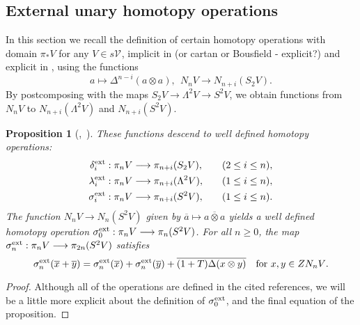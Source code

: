 \documentclass[11pt]{amsart}
\theoremstyle{plain}
\newtheorem{prop}[thm]{Proposition}
\theoremstyle{definition}
\let\oldphi\phi
\let\phi\varphi
\renewcommand{\to}{\longrightarrow}
\newcommand{\calV}{\mathcal{V}}
\theoremstyle{plain}
\newcommand{\vect}[2]{\calV^{#1}_{#2}}
\newcommand{\DeltaUp}{\Delta}%
\begin{document}
\begin{Constructing homotopy and cohomotopy operations}
\subsection{External unary homotopy operations}
In this section we recall the definition of certain homotopy operations with domain $\pi_*V$ for any $V\in s\vect{}{}$, implicit in \cite[\S4]{DwyerHtpyOpsSimpComAlg.pdf} (or cartan or Bousfield - explicit?) and explicit in 
\cite[\S3]{MR1089001}, using the functions
\[a \mapsto \DeltaUp^{n-i}(a\otimes a),\ \ N_nV \to N_{n+i}(S_2V).\]
By postcomposing with the maps $S_2V\to \Lambda^{2}V\to S^2V$, we obtain functions from $N_nV$ to $N_{n+i}(\Lambda^2V)$ and $N_{n+i}(S^2V)$.
\begin{prop}[{\cite[Lemma 4.1]{DwyerHtpyOpsSimpComAlg.pdf},\ \cite[\S3]{MR1089001}}] \label{extUnaryHomotOps}
These functions descend to  well defined homotopy operations:
\begin{alignat*}{2}
\delta_i^\textup{ext}:\pi_nV&\to \pi_{n+i}(S_2V),&\quad&(2\leq i\leq n),\\
\lambda_i^\textup{ext}:\pi_nV&\to \pi_{n+i}(\Lambda^2V),&\quad&(1\leq i\leq n),\\
\sigma_i^\textup{ext}:\pi_nV&\to \pi_{n+i}(S^2V),&\quad&(1\leq i\leq n).
\end{alignat*}
The function $N_nV \to N_{n}(S^2V)$ given by $\overline{a}\mapsto \overline{a\otimes a}$ yields a well defined homotopy operation $\sigma_0^\textup{ext}:\pi_nV\to \pi_{n}(S^2V)$. 
For all $n\geq0$, the map $\sigma_n^\textup{ext}:\pi_nV\to\pi_{2n}(S^2V)$ satisfies
\[\sigma_n^\textup{ext}(\overline{x}+\overline{y})=\sigma_n^\textup{ext}(\overline{x})+\sigma_n^\textup{ext}(\overline{y})+\overline{(1+T)\Delta(x\otimes y)}\quad\text{for $x,y\in ZN_nV$}.\]
\end{prop}
\begin{proof}
Although all of the operations  are defined in the cited references, we will be a little more explicit about the definition of $\sigma^\textup{ext}_0$, and the final equation of the proposition.


\end{proof}
\end{Constructing homotopy and cohomotopy operations}
\end{document}
